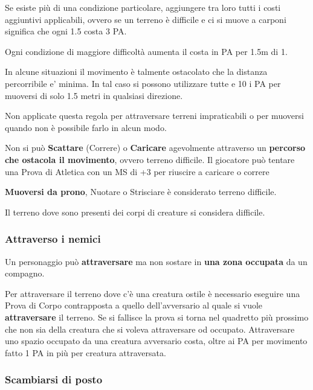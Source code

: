 \documentclass[12pt,a4paper,twoside,openany]{book}
\begin{document}
\begin{multicols}{2}
Se esiste più di una condizione particolare, aggiungere tra loro tutti i costi aggiuntivi applicabili, ovvero se un terreno è difficile e ci si muove a carponi significa che ogni 1.5 costa 3 PA.

Ogni condizione di maggiore difficoltà aumenta il costa in PA per 1.5m di 1.

In alcune situazioni il movimento è talmente ostacolato che la distanza percorribile e' minima. In tal caso si possono utilizzare tutte e 10 i PA per muoversi di solo 1.5 metri in qualsiasi direzione.

Non applicate questa regola per attraversare terreni impraticabili o per muoversi quando non è possibile farlo in alcun modo.

Non si può \textbf{Scattare} (Correre) o \textbf{Caricare}  agevolmente attraverso un \textbf{percorso che ostacola il movimento}, ovvero terreno difficile. Il giocatore può tentare una Prova di Atletica con un MS di +3 per riuscire a caricare o correre

\textbf{Muoversi da prono}, Nuotare o Strisciare è considerato terreno difficile.

Il terreno dove sono presenti dei corpi di creature si considera difficile.

\subsubsection{Attraverso i nemici}\label{attraversonemici}

Un personaggio può \textbf{attraversare} ma non sostare in \textbf{una zona occupata} da un compagno.

Per attraversare il terreno dove c'è una creatura ostile è necessario eseguire una Prova di Corpo contrapposta a quello dell'avversario al quale si vuole \textbf{attraversare} il terreno. Se si fallisce la prova si torna nel quadretto più prossimo che non sia della creatura che si voleva attraversare od occupato. Attraversare uno spazio occupato da una creatura avversario costa, oltre ai PA per movimento fatto 1 PA in più per creatura attraversata.


\subsubsection{Scambiarsi di posto}\label{scambiarsidiposto}


\end{multicols}
\end{document}
